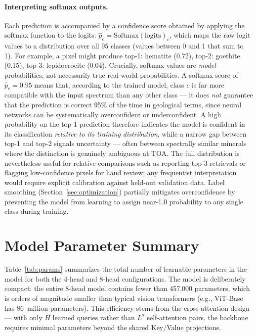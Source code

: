 \documentclass[11pt]{report}
\begin{document}
\paragraph{Interpreting softmax outputs.}
Each prediction is accompanied by a confidence score obtained by applying the softmax function to the logits: $\hat{p}_c = \text{Softmax}(\text{logits})_c$, which maps the raw logit values to a distribution over all 95 classes (values between 0 and 1 that sum to 1). For example, a pixel might produce top-1: hematite (0.72), top-2: goethite (0.15), top-3: lepidocrocite (0.04). Crucially, softmax values are \emph{model} probabilities, not necessarily true real-world probabilities. A softmax score of $\hat{p}_c = 0.95$ means that, according to the trained model, class $c$ is far more compatible with the input spectrum than any other class --- it does \emph{not} guarantee that the prediction is correct 95\% of the time in geological terms, since neural networks can be systematically overconfident or underconfident. A high probability on the top-1 prediction therefore indicates the model is confident in its classification \emph{relative to its training distribution}, while a narrow gap between top-1 and top-2 signals uncertainty --- often between spectrally similar minerals where the distinction is genuinely ambiguous at TOA. The full distribution is nevertheless useful for relative comparisons such as reporting top-3 retrievals or flagging low-confidence pixels for hand review; any frequentist interpretation would require explicit calibration against held-out validation data. Label smoothing (Section~\ref{sec:optimization}) partially mitigates overconfidence by preventing the model from learning to assign near-1.0 probability to any single class during training.

\section{Model Parameter Summary}
\label{sec:param_summary}

Table~\ref{tab:params} summarizes the total number of learnable parameters in the model for both the 4-head and 8-head configurations. The model is deliberately compact: the entire 8-head model contains fewer than 457{,}000 parameters, which is orders of magnitude smaller than typical vision transformers (e.g., ViT-Base has 86~million parameters). This efficiency stems from the cross-attention design --- with only $H$ learned queries rather than $L^2$ self-attention pairs, the backbone requires minimal parameters beyond the shared Key/Value projections.
\end{document}

